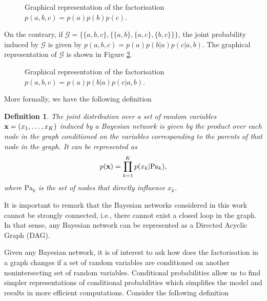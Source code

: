 \documentclass[12pt, oneside]{book}
\numberwithin{equation}{section}
\newcommand{\x}{{\bf x}}
\newtheorem{definition}{Definition}[section]
\begin{document}
{\begin{figure}[h!]
	\centering
	
	\caption{Graphical representation of the factorisation $p(a,b,c) = p(a) p(b) p(c)$.}
	\label{fig:bayes-net-1}
\end{figure}

On the contrary, if $\mathcal G = \{\{a,b,c\}, \{\{a, b\}, \{a, c\}, \{b, c\}\}\}$, the joint probability induced by $\mathcal G$ is given by  $p(a,b,c) = p(a)p(b \vert a)p(c \vert a, b)$. The graphical representation of $\mathcal G$ is shown in Figure \ref{fig:bayes-net-2}.

\begin{figure}[h!]
	\centering
	
	\caption{Graphical representation of the factorisation $p(a,b,c) = p(a) p(b \vert a) p(c \vert a, b)$.}
	\label{fig:bayes-net-2}
\end{figure}


More formally, we have the following definition
\begin{definition}
	The joint distribution over a set of random variables $\x = (x_1, \ldots, x_K)$ induced by a Bayesian network is given by the product over each node in the graph conditioned on the variables corresponding to the parents of that node in the graph. It can be represented as
	\begin{equation}
		p({\bf x}) = \prod_{k=1}^K p(x_k \vert \text{Pa}_k),
	\end{equation}
	where $\text{Pa}_k$ is the set of nodes that directly influence $x_k$.
\end{definition}

It is important to remark that the Bayesian networks considered in this work cannot be strongly connected, i.e., there cannot exist a closed loop in the graph. In that sense, any Bayesian network can be represented as a Directed Acyclic Graph (DAG).

Given any Bayesian network, it is of interest to ask how does the factorisation in a graph changes if a set of random variables are conditioned on another nonintersecting set of random variables. Conditional probabilities allow us to find simpler representations of conditional probabilities which simplifies the model and results in more efficient computations. Consider the following definition


}
\end{document}
